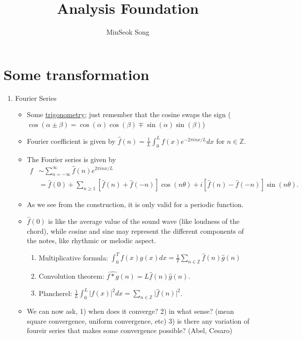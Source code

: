 \documentclass[11pt,reqno]{amsart}
\title{Analysis Foundation}
\author{MinSeok Song}
\date{}
\theoremstyle{remark}
\begin{document}
\maketitle
\begin{sloppypar}
\section*{Some transformation}
\begin{enumerate}
\item Fourier Series
\begin{itemize}
\item Some \href{https://www.eeweb.com/tools/trigonometry-laws-and-identities-sheet/}{trigonometry};
 just remember that the cosine swaps the sign ($\cos(\alpha \pm\beta)=\cos(\alpha)\cos(\beta)\mp \sin(\alpha)\sin(\beta)$)
\item Fourier coefficient is given by $\hat f(n)=\frac 1L\int^L_0 f(x)e^{-2\pi inx/L}dx$ for $n\in\mathbb{Z}$.
\item The Fourier series is given by
\begin{equation}
\begin{aligned}
f &\sim \sum_{n = -\infty}^{\infty} \hat{f}(n) e^{2\pi i n x / L} \\
&= \hat{f}(0) + \sum_{n \geq 1} [\hat{f}(n) + \hat{f}(-n)]\cos (n\theta) + i[\hat{f}(n) - \hat{f}(-n)]\sin(n\theta).
\end{aligned}
\end{equation}
\item As we see from the construction, it is only valid for a periodic function.
\item $\hat f(0)$ is like the average value of the sound wave (like loudness of the chord), while cosine and sine
 may represent the different components of the notes, like rhythmic or melodic aspect.
\begin{enumerate}
\item Multiplicative formula: $\int^T_0 f(x)g(x)dx=\frac 1T\sum\limits_{n\in\mathbb{Z}}\hat f(n)\hat g(n)$
\item Convolution theorem: $\widehat{f * g}(n)=L\hat f(n)\hat g(n)$.
\item Plancherel: $\frac 1L\int^L_0\lvert f(x)\rvert^2dx=\sum\limits_{n\in\mathbb{Z}}\lvert \hat f(n)\rvert^2$.
\end{enumerate}
\item We can now ask, 1) when does it converge? 2) in what sense? (mean square convergence, uniform convergence, etc) 3) is there any variation of foureir series that makes some convergence possible? (Abel, Cesaro)

\end{itemize}
\end{enumerate}
\end{sloppypar}
\end{document}
